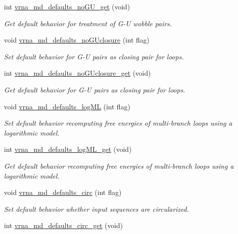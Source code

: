 \begin{DoxyCompactItemize}
int \hyperlink{group__model__details_ga5faa7d4e536d7fe36ec25428c0cf2563}{vrna\+\_\+md\+\_\+defaults\+\_\+no\+G\+U\+\_\+get} (void)
\begin{DoxyCompactList}\small\item\em Get default behavior for treatment of G-\/U wobble pairs. \end{DoxyCompactList}\item 
void \hyperlink{group__model__details_gade5b9951d71ca2fb357a4e6c0c18ccd1}{vrna\+\_\+md\+\_\+defaults\+\_\+no\+G\+Uclosure} (int flag)
\begin{DoxyCompactList}\small\item\em Set default behavior for G-\/U pairs as closing pair for loops. \end{DoxyCompactList}\item 
int \hyperlink{group__model__details_ga4f7fdad083243a5348d63320ddaa70f3}{vrna\+\_\+md\+\_\+defaults\+\_\+no\+G\+Uclosure\+\_\+get} (void)
\begin{DoxyCompactList}\small\item\em Get default behavior for G-\/U pairs as closing pair for loops. \end{DoxyCompactList}\item 
void \hyperlink{group__model__details_ga3de50a73455d88c3957386933b8e1f90}{vrna\+\_\+md\+\_\+defaults\+\_\+log\+ML} (int flag)
\begin{DoxyCompactList}\small\item\em Set default behavior recomputing free energies of multi-\/branch loops using a logarithmic model. \end{DoxyCompactList}\item 
int \hyperlink{group__model__details_ga93f04e070d529c5d0bb87c9681f6ad29}{vrna\+\_\+md\+\_\+defaults\+\_\+log\+M\+L\+\_\+get} (void)
\begin{DoxyCompactList}\small\item\em Get default behavior recomputing free energies of multi-\/branch loops using a logarithmic model. \end{DoxyCompactList}\item 
void \hyperlink{group__model__details_ga4e1deb3e91a8a99e5c6dd905a5eb0186}{vrna\+\_\+md\+\_\+defaults\+\_\+circ} (int flag)
\begin{DoxyCompactList}\small\item\em Set default behavior whether input sequences are circularized. \end{DoxyCompactList}\item 
int \hyperlink{group__model__details_gad3a7e58de344ad93a08925f58f94f6fb}{vrna\+\_\+md\+\_\+defaults\+\_\+circ\+\_\+get} (void)

\end{DoxyCompactItemize}
